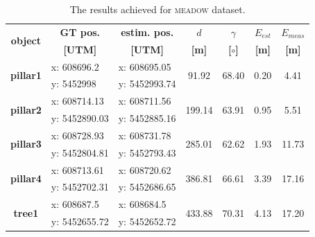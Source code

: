 \begin{table}[!h]
	\centering
	\caption{The results achieved for \textsc{meadow} dataset.}
	\begin{tabular}{crrcccc}
		\toprule
		\multirow{2}[0]{*}{\textbf{object}} & \multicolumn{1}{c}{\textbf{GT pos.}} & \multicolumn{1}{c}{\textbf{estim. pos. }} & \textbf{$d$} & \textbf{$\gamma$} & \textbf{$E_{est}$} & \textbf{$E_{meas}$} \\
		\textbf{} & \multicolumn{1}{c}{\textbf{[UTM]}} & \multicolumn{1}{c}{\textbf{[UTM]}} & \textbf{[m]} & \textbf{[$\circ$]} & \textbf{[m]} & \textbf{[m]} \\
		\midrule
		\multirow{2}[0]{*}{\textbf{pillar1}} & \multicolumn{1}{l}{x: 608696.2} & \multicolumn{1}{l}{x: 608695.05} & \multirow{2}[0]{*}{91.92} & \multirow{2}[0]{*}{68.40} & \multirow{2}[0]{*}{0.20} & \multirow{2}[0]{*}{4.41} \\
		& \multicolumn{1}{l}{y: 5452998} & \multicolumn{1}{l}{y: 5452993.74} &       &       &       &  \\
		\multirow{2}[0]{*}{\textbf{pillar2}} & \multicolumn{1}{l}{x: 608714.13} & \multicolumn{1}{l}{x: 608711.56} & \multirow{2}[0]{*}{199.14} & \multirow{2}[0]{*}{63.91} & \multirow{2}[0]{*}{0.95} & \multirow{2}[0]{*}{5.51} \\
		& \multicolumn{1}{l}{y: 5452890.03} & \multicolumn{1}{l}{y: 5452885.16} &       &       &       &  \\
		\multirow{2}[0]{*}{\textbf{pillar3}} & \multicolumn{1}{l}{x: 608728.93} & \multicolumn{1}{l}{x: 608731.78} & \multirow{2}[0]{*}{285.01} & \multirow{2}[0]{*}{62.62} & \multirow{2}[0]{*}{1.93} & \multirow{2}[0]{*}{11.73} \\
		& \multicolumn{1}{l}{y: 5452804.81} & \multicolumn{1}{l}{y: 5452793.43} &       &       &       &  \\
		\multirow{2}[0]{*}{\textbf{pillar4}} & \multicolumn{1}{l}{x: 608713.61} & \multicolumn{1}{l}{x: 608720.62} & \multirow{2}[0]{*}{386.81} & \multirow{2}[0]{*}{66.61} & \multirow{2}[0]{*}{3.39} & \multirow{2}[0]{*}{17.16} \\
		& \multicolumn{1}{l}{y: 5452702.31} & \multicolumn{1}{l}{y: 5452686.65} &       &       &       &  \\
		\multirow{2}[0]{*}{\textbf{tree1}} & \multicolumn{1}{l}{x: 608687.5} & \multicolumn{1}{l}{x: 608684.5} & \multirow{2}[0]{*}{433.88} & \multirow{2}[0]{*}{70.31} & \multirow{2}[0]{*}{4.13} & \multirow{2}[0]{*}{17.20} \\
		& \multicolumn{1}{l}{y: 5452655.72} & \multicolumn{1}{l}{y: 5452652.72} &       &       &       &  \\

\end{tabular}
\end{table}
